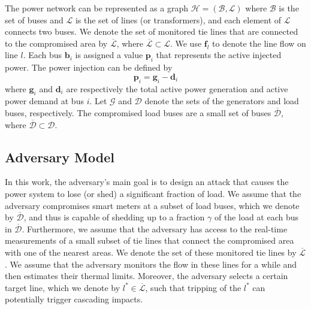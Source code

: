 \documentclass[journal]{IEEEtran}
\begin{document}
The power network can be represented as a graph   $\mathcal{H}=(\mathcal{B},\mathcal{L})$ where $\mathcal{B}$ is the set of buses and $\mathcal{L}$ is the set of lines (or transformers), and each element of $\mathcal{L}$ connects two buses. We denote the set of monitored tie lines that are connected to the compromised area by $ \mathcal{\overline{L}}$, where $ \mathcal{\overline{L}}  \subset \mathcal{L}$.  We use $\mathbf{f}_{l}$ to denote the line flow on line $l$.
Each bus $\mathbf{b}_i$ is assigned a value $\mathbf{p}_i$ that represents the active injected power. The power injection can be defined by
\begin{equation}
\label{Pinj}
\mathbf{p}_i = \mathbf{g}_i -\mathbf{d}_i
\end{equation}
where $\mathbf{g}_i$ and $\mathbf{d}_i$ are respectively the total active power generation and active power demand at bus $i$. Let $\mathcal{G}$ and $\mathcal{D}$ denote the sets of the generators and load buses, respectively. The compromised load buses are a small set of buses $\mathcal{\overline{D}}$, where $\mathcal{\overline{D}} \subset \mathcal{D}$.
      




\subsection{Adversary Model}

In this work, the adversary's main goal is to design an attack that causes the power system to lose (or shed) a significant fraction of load. We assume that the adversary compromises smart meters at a subset of load buses, which we denote by $\mathcal{\overline{D}}$, and thus is capable of shedding up to a fraction $\gamma$ of the load at each bus in $\mathcal{\overline{D}}$. Furthermore, we assume that the adversary has access to the real-time measurements of a small subset of tie lines that connect the compromised area with one of the nearest areas. We denote the set of these monitored tie lines by $ \mathcal{\overline{L}}$. We assume that the adversary monitors the flow in these lines for a while and then estimates their thermal limits. Moreover, the adversary selects a certain target line, which we denote by $l^*\in  \mathcal{\overline{L}}$, such that tripping of the $l^*$ can potentially trigger cascading impacts.  
\end{document}
